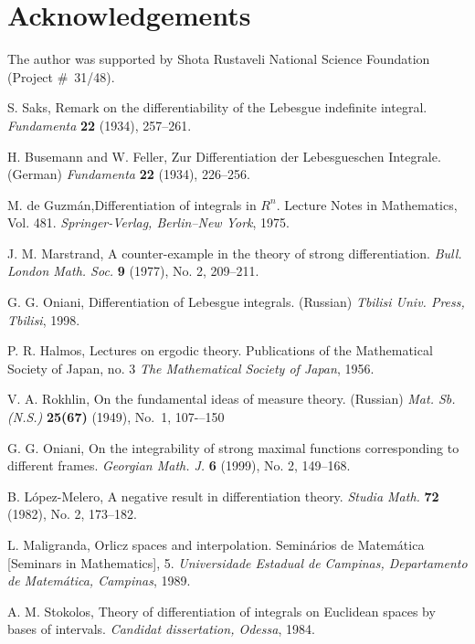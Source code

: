 \documentclass[12pt,reqno]{article}
\theoremstyle{remark}
\begin{document}
\section*{Acknowledgements}

The author was supported by Shota Rustaveli National Science Foundation (Project \#~31/48).

\begin{thebibliography}{99}


 S. Saks, Remark on the differentiability of the Lebesgue indefinite integral. \emph{Fundamenta} \textbf{22} (1934), 257--261.

 H. Busemann and W. Feller, Zur Differentiation der Lebesgueschen Integrale. (German) \emph{Fundamenta} \textbf{22} (1934), 226--256.

 M. de Guzm\'{a}n,Differentiation of integrals in $R^{n}$. Lecture Notes in Mathematics, Vol. 481. \emph{Springer-Verlag, Berlin--New York}, 1975.

 J. M. Marstrand, A counter-example in the theory of strong differentiation. \emph{Bull. London Math. Soc.}  \textbf{9}  (1977), No. 2, 209--211.

 G. G. Oniani, Differentiation of Lebesgue integrals. (Russian) \emph{Tbilisi Univ. Press, Tbilisi}, 1998.

 P. R. Halmos, Lectures on ergodic theory. Publications of the Mathematical Society of Japan, no. 3 \emph{The Mathematical Society of Japan}, 1956.

 V. A. Rokhlin, On the fundamental ideas of measure theory. (Russian) \emph{Mat. Sb. (N.S.)} \textbf{25(67)} (1949),  No.~1, 107-–150

 G. G. Oniani, On the integrability of strong maximal functions corresponding to different frames. \emph{Georgian Math. J.}  \textbf{6}  (1999), No. 2, 149--168.

 B. L\'{o}pez-Melero, A negative result in differentiation theory. \emph{Studia Math.}  \textbf{72}  (1982), No. 2, 173--182.

 L. Maligranda, Orlicz spaces and interpolation. Semin\'{a}rios de Matem\'{a}tica [Seminars in Mathematics], 5. \emph{Universidade Estadual de Campinas, Departamento de Matem\'{a}tica, Campinas}, 1989.

 A. M. Stokolos, Theory of differentiation of integrals on Euclidean spaces by bases of intervals. \emph{Candidat dissertation, Odessa}, 1984.

\end{thebibliography}






\end{document}
